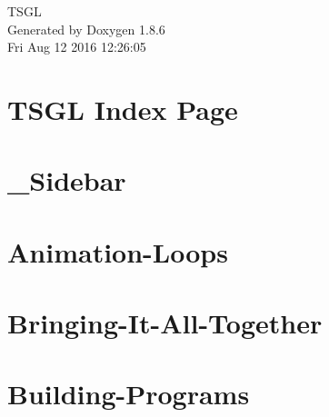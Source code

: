 \documentclass[twoside]{book}
\newcommand{\clearemptydoublepage}{%
  \newpage{\pagestyle{empty}\cleardoublepage}%
}
\begin{document}
\hypersetup{pageanchor=false}
\begin{titlepage}
\vspace*{7cm}
\begin{center}%
{\Large T\-S\-G\-L }\\
\vspace*{1cm}
{\large Generated by Doxygen 1.8.6}\\
\vspace*{0.5cm}
{\small Fri Aug 12 2016 12:26:05}\\
\end{center}
\end{titlepage}
\clearemptydoublepage
\tableofcontents
\clearemptydoublepage
{}
\hypersetup{pageanchor=true}

\chapter{T\-S\-G\-L Index Page}
\label{index}\hypertarget{index}{}
\chapter{\-\_\-\-Sidebar}
\label{md__home_kodemonkey_workspace__t_s_g_l_docs-wiki___sidebar}
\hypertarget{md__home_kodemonkey_workspace__t_s_g_l_docs-wiki___sidebar}{}

\chapter{Animation-\/\-Loops}
\label{md__home_kodemonkey_workspace__t_s_g_l_docs-wiki__animation-_loops}
\hypertarget{md__home_kodemonkey_workspace__t_s_g_l_docs-wiki__animation-_loops}{}

\chapter{Bringing-\/\-It-\/\-All-\/\-Together}
\label{md__home_kodemonkey_workspace__t_s_g_l_docs-wiki__bringing-_it-_all-_together}
\hypertarget{md__home_kodemonkey_workspace__t_s_g_l_docs-wiki__bringing-_it-_all-_together}{}

\chapter{Building-\/\-Programs}
\label{md__home_kodemonkey_workspace__t_s_g_l_docs-wiki__building-_programs}
\hypertarget{md__home_kodemonkey_workspace__t_s_g_l_docs-wiki__building-_programs}{}

\end{document}
